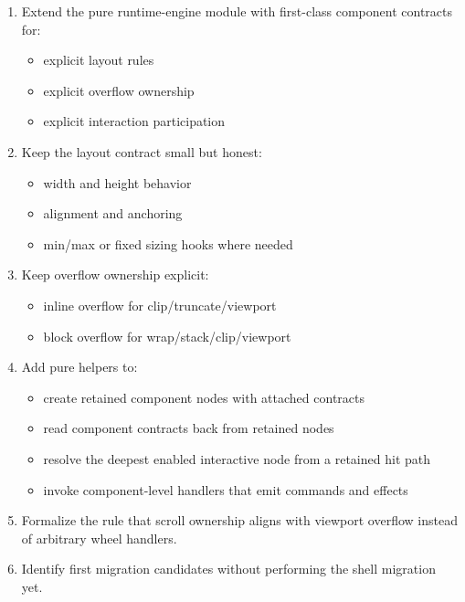 \begin{enumerate}
\def\labelenumi{\arabic{enumi}.}
\tightlist
\item
  Extend the pure runtime-engine module with first-class component contracts for:

  \begin{itemize}
  \tightlist
  \item
    explicit layout rules
  \item
    explicit overflow ownership
  \item
    explicit interaction participation
  \end{itemize}
\item
  Keep the layout contract small but honest:

  \begin{itemize}
  \tightlist
  \item
    width and height behavior
  \item
    alignment and anchoring
  \item
    min/max or fixed sizing hooks where needed
  \end{itemize}
\item
  Keep overflow ownership explicit:

  \begin{itemize}
  \tightlist
  \item
    inline overflow for clip/truncate/viewport
  \item
    block overflow for wrap/stack/clip/viewport
  \end{itemize}
\item
  Add pure helpers to:

  \begin{itemize}
  \tightlist
  \item
    create retained component nodes with attached contracts
  \item
    read component contracts back from retained nodes
  \item
    resolve the deepest enabled interactive node from a retained hit path
  \item
    invoke component-level handlers that emit commands and effects
  \end{itemize}
\item
  Formalize the rule that scroll ownership aligns with viewport overflow instead of arbitrary wheel handlers.
\item
  Identify first migration candidates without performing the shell migration yet.
\end{enumerate}

